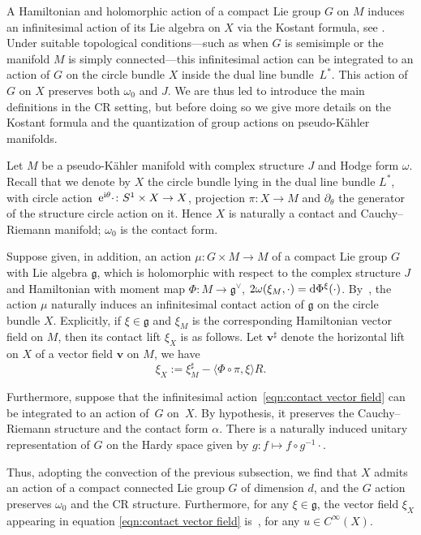 \documentclass[10pt,a4paper]{amsart}
\numberwithin{equation}{section}
\begin{document}
A Hamiltonian and holomorphic action of a compact Lie group $G$ on $M$ induces an infinitesimal action of its Lie algebra on $X$ via the Kostant formula, see \cite{ko}. Under suitable topological conditions—such as when $G$ is semisimple or the manifold $M$ is simply connected—this infinitesimal action can be integrated to an action of $G$ on the circle bundle $X$ inside the dual line bundle~$L^*$. This action of $G$ on $X$ preserves both $\omega_0$ and $J$. We are thus led to introduce the main definitions in the CR setting, but before doing so we give more details on the Kostant formula and the quantization of group actions on pseudo-K\"ahler manifolds.

Let $M$ be a pseudo-K\"ahler manifold with complex structure $J$ and Hodge form $\omega$. Recall that we denote by $X$ the circle bundle lying in the dual line bundle $L^*$, with circle action~${{\rm e}^{{\rm i}\theta}\cdot \colon S^1\times X\rightarrow X}$, projection $\pi\colon X\rightarrow M$ and $\partial_\theta$ the generator of the structure circle action on it. Hence $X$ is naturally a contact and Cauchy--Riemann manifold; $\omega_0$ is the contact form.

Suppose given, in addition, an action $\mu \colon G\times M\rightarrow M$ of a compact Lie group $G$ with Lie algebra $\mathfrak{g}$, which is holomorphic with respect to the complex structure $J$ and Hamiltonian with moment map $\Phi\colon M\rightarrow \mathfrak{g}^\vee$,
$2 \omega(\xi_M, \cdot)={\rm d}\Phi^{\xi}(\cdot)$.
By~\cite{ko}, the action $\mu$ naturally induces an infinitesimal contact action of $\mathfrak{g}$ on the circle bundle $X$. Explicitly, if $\xi\in \mathfrak{g}$ and $\xi_M$ is the corresponding Hamiltonian vector field on $M$, then its contact lift $\xi_X$ is as follows.
Let $\mathbf{v}^\sharp$ denote the horizontal lift on $X$ of a vector field $\mathbf{v}$ on $M$, we have
\begin{equation}\label{eqn:contact vector field}
\xi_X:= \xi_M^\sharp-\langle \Phi\circ \pi, \xi\rangle R .
\end{equation}

Furthermore, suppose that the infinitesimal action~\eqref{eqn:contact vector field} can be integrated to an action of~$G$ on~$X$. By hypothesis, it preserves the Cauchy--Riemann structure and the contact form $\alpha$. There is a naturally induced unitary representation of $G$ on the Hardy space
 given by
$ g \colon f \mapsto f\circ {g^{-1}}\cdot$.
	
Thus, adopting the convection of the previous subsection, we find that $X$ admits an action of a compact connected Lie group $G$ of dimension $d$, and the $G$ action preserves $\omega_0$ and the CR structure. Furthermore, for any $\xi \in \mathfrak{g}$, the vector field $\xi_X$ appearing in equation \eqref{eqn:contact vector field} is~, for any $u\in {C}^\infty(X)$.
	
\end{document}
